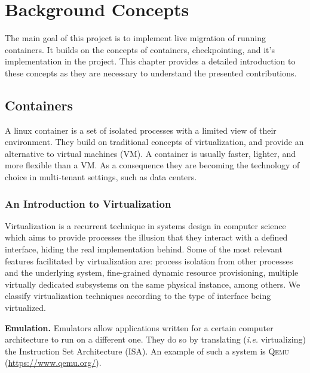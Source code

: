 \chapter{Background Concepts} \label{chap:background}

The main goal of this project is to implement live migration of running containers.
It builds on the concepts of containers, checkpointing, and it's implementation in the \criu project.
This chapter provides a detailed introduction to these concepts as they are necessary to understand the presented contributions.

\section{Containers} \label{sec:containers}

A linux container is a set of isolated processes with a limited view of their environment.
They build on traditional concepts of virtualization, and provide an alternative to virtual machines (VM).
A container is usually faster, lighter, and more flexible than a VM.
As a consequence they are becoming the technology of choice in multi-tenant settings, such as data centers.

\subsection{An Introduction to Virtualization}

Virtualization is a recurrent technique in systems design in computer science which aims to provide processes the illusion that they interact with a defined interface, hiding the real implementation behind.
Some of the most relevant features facilitated by virtualization are: process isolation from other processes and the underlying system, fine-grained dynamic resource provisioning, multiple virtually dedicated subsystems on the same physical instance, among others.
We classify virtualization techniques according to the type of interface being virtualized.

\textbf{Emulation.}
Emulators allow applications written for a certain computer architecture to run on a different one.
They do so by translating (\textit{i.e.} virtualizing) the Instruction Set Architecture (ISA).
An example of such a system is \textsc{Qemu} (\url{https://www.qemu.org/}).

